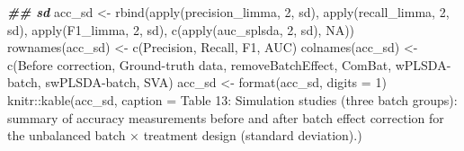 \documentclass[
]{book}
\newenvironment{Shaded}{\begin{snugshade}}{\end{snugshade}}
\newcommand{\AttributeTok}[1]{\textcolor[rgb]{0.77,0.63,0.00}{#1}}
\newcommand{\ConstantTok}[1]{\textcolor[rgb]{0.00,0.00,0.00}{#1}}
\newcommand{\DecValTok}[1]{\textcolor[rgb]{0.00,0.00,0.81}{#1}}
\newcommand{\DocumentationTok}[1]{\textcolor[rgb]{0.56,0.35,0.01}{\textbf{\textit{#1}}}}
\newcommand{\FunctionTok}[1]{\textcolor[rgb]{0.00,0.00,0.00}{#1}}
\newcommand{\NormalTok}[1]{#1}
\newcommand{\OtherTok}[1]{\textcolor[rgb]{0.56,0.35,0.01}{#1}}
\newcommand{\SpecialCharTok}[1]{\textcolor[rgb]{0.00,0.00,0.00}{#1}}
\newcommand{\StringTok}[1]{\textcolor[rgb]{0.31,0.60,0.02}{#1}}
\begin{document}
\begin{Shaded}
\begin{Highlighting}[]
\DocumentationTok{\#\# sd}
\NormalTok{acc\_sd }\OtherTok{\textless{}{-}} \FunctionTok{rbind}\NormalTok{(}\FunctionTok{apply}\NormalTok{(precision\_limma, }\DecValTok{2}\NormalTok{, sd), }\FunctionTok{apply}\NormalTok{(recall\_limma, }\DecValTok{2}\NormalTok{, sd), }
                \FunctionTok{apply}\NormalTok{(F1\_limma, }\DecValTok{2}\NormalTok{, sd), }\FunctionTok{c}\NormalTok{(}\FunctionTok{apply}\NormalTok{(auc\_splsda, }\DecValTok{2}\NormalTok{, sd), }\ConstantTok{NA}\NormalTok{))}
\FunctionTok{rownames}\NormalTok{(acc\_sd) }\OtherTok{\textless{}{-}} \FunctionTok{c}\NormalTok{(}\StringTok{\textquotesingle{}Precision\textquotesingle{}}\NormalTok{, }\StringTok{\textquotesingle{}Recall\textquotesingle{}}\NormalTok{, }\StringTok{\textquotesingle{}F1\textquotesingle{}}\NormalTok{, }\StringTok{\textquotesingle{}AUC\textquotesingle{}}\NormalTok{)}
\FunctionTok{colnames}\NormalTok{(acc\_sd) }\OtherTok{\textless{}{-}} \FunctionTok{c}\NormalTok{(}\StringTok{\textquotesingle{}Before correction\textquotesingle{}}\NormalTok{, }\StringTok{\textquotesingle{}Ground{-}truth data\textquotesingle{}}\NormalTok{, }
                      \StringTok{\textquotesingle{}removeBatchEffect\textquotesingle{}}\NormalTok{, }\StringTok{\textquotesingle{}ComBat\textquotesingle{}}\NormalTok{, }
                      \StringTok{\textquotesingle{}wPLSDA{-}batch\textquotesingle{}}\NormalTok{, }\StringTok{\textquotesingle{}swPLSDA{-}batch\textquotesingle{}}\NormalTok{, }\StringTok{\textquotesingle{}SVA\textquotesingle{}}\NormalTok{)}
\NormalTok{acc\_sd }\OtherTok{\textless{}{-}} \FunctionTok{format}\NormalTok{(acc\_sd, }\AttributeTok{digits =} \DecValTok{1}\NormalTok{)}
\NormalTok{knitr}\SpecialCharTok{::}\FunctionTok{kable}\NormalTok{(acc\_sd, }\AttributeTok{caption =} \StringTok{\textquotesingle{}Table 13: Simulation studies (three batch groups): summary of accuracy measurements before and after batch effect correction for the unbalanced batch × treatment design (standard deviation).\textquotesingle{}}\NormalTok{)}
\end{Highlighting}
\end{Shaded}
\end{document}
